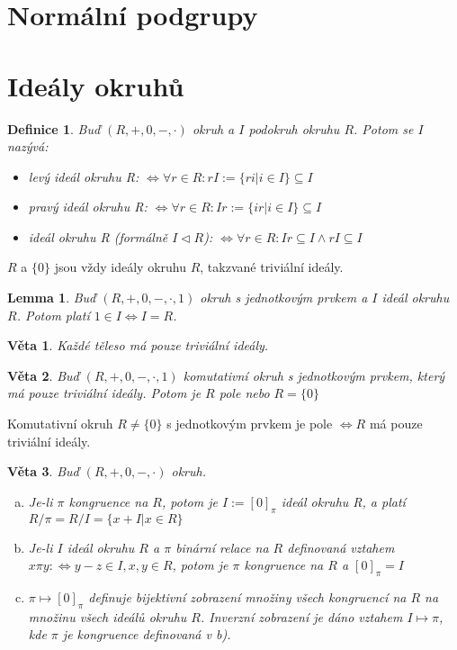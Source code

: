 \documentclass[a4paper, 11pt]{report}
\newtheorem{mydef}{Definice}[chapter]
\newtheorem{veta}{Věta}
\newtheorem{lemma}{Lemma}
\begin{document}
\section{Normální podgrupy}
\section{Ideály okruhů}

\begin{mydef}
Buď $(R, +, 0, -, \cdot)$ okruh a $I$ podokruh okruhu $R$. Potom se $I$ nazývá:
\begin{itemize}
	\item \emph{levý ideál} okruhu R: $\Leftrightarrow \forall r \in R: rI := \{ri | i \in I\} \subseteq I$
	\item \emph{pravý ideál} okruhu R: $\Leftrightarrow \forall r \in R: Ir := \{ir | i \in I\} \subseteq I$
	\item \emph{ideál} okruhu R (formálně $I \triangleleft R$): $\Leftrightarrow \forall r \in R: Ir  \subseteq I \land rI \subseteq I$
\end{itemize}
\end{mydef}

$R$ a $\{0\}$ jsou vždy ideály okruhu $R$, takzvané triviální ideály.

\begin{lemma}
Buď $(R, +, 0, -, \cdot, 1)$ okruh s jednotkovým prvkem a $I$ ideál okruhu $R$. Potom platí $1 \in I \Leftrightarrow I = R$.
\end{lemma}

\begin{veta}
Každé těleso má pouze triviální ideály.
\end{veta}

\begin{veta}
Buď $(R, +, 0, -, \cdot, 1)$ komutativní okruh s jednotkovým prvkem, který má pouze triviální ideály. Potom je $R$ pole nebo $R = \{0\}$
\end{veta}

Komutativní okruh $R \not= \{0\}$ s jednotkovým prvkem je pole $\Leftrightarrow R$ má pouze triviální ideály.

\begin{veta}
Buď $(R, +, 0, -, \cdot)$ okruh.
\begin{enumerate}[a)]
	\item Je-li $\pi$ kongruence na $R$, potom je $I := [0]_\pi$ ideál okruhu R, a platí $R/\pi = R/I = \{x + I | x \in R\}$
	\item Je-li $I$ ideál okruhu $R$ a $\pi$ binární relace na $R$ definovaná vztahem $x \pi y :\Leftrightarrow y - z \in I, x,y \in R$, potom je $\pi$ kongruence na $R$ a $[0]_\pi = I$
	\item $\pi \mapsto [0]_\pi$ definuje bijektivní zobrazení množiny všech kongruencí na $R$ na množinu všech ideálů okruhu $R$. Inverzní zobrazení je dáno vztahem $I \mapsto \pi$, kde $\pi$ je kongruence definovaná v b). 
\end{enumerate}
\end{veta}
\end{document}
